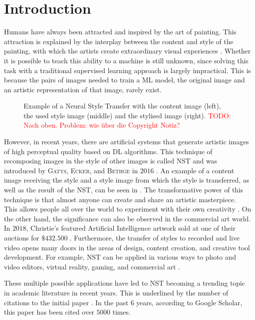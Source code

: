 \section{Introduction}
Humans have always been attracted and inspired by the art of painting. This attraction is explained by the interplay between the content and style of the painting, with which the artists create extraordinary visual experiences \cite{Glas2021}. Whether it is possible to teach this ability to a machine is still unknown, since solving this task with a traditional supervised learning approach is largely impractical. This is because the pairs of images needed to train a \gls{ML} model, the original image and an artistic representation of that image, rarely exist.
\begin{figure*}[!b]
	\centering
	
	\caption{Example of a Neural Style Transfer with the content image \contentimage{} (left), the used style image \styleimage{} (middle) and the stylised image \image{} (right). \textcolor{red}{TODO: Nach oben. Problem: wie über die Copyright Notiz?}}
	\label{fig:fig_nst}
\end{figure*}
 
However, in recent years, there are artificial systems that generate artistic images of high perceptual quality based on \gls{DL} algorithms. This technique of recomposing images in the style of other images is called \gls{NST} and was introduced by \textsc{Gatys}, \textsc{Ecker}, and \textsc{Bethge} in $2016$ \cite{GEB2016}. An example of a content image receiving the style and a style image from which the style is transferred, as well as the result of the \gls{NST}, can be seen in . The transformative power of this technique is that almost anyone can create and share an artistic masterpiece. This allows people all over the world to experiment with their own creativity \cite{Kel2018}. On the other hand, the significance can also be observed in the commercial art world. In $2018$, Christie's featured Artificial Intelligence artwork sold at one of their auctions for $\$432.500$ \cite{2018}. Furthermore, the transfer of styles to recorded and live video opens many doors in the areas of design, content creation, and creative tool development. For example, \gls{NST} can be applied in various ways to photo and video editors, virtual reality, gaming, and commercial art \cite{Glas2021, Ioa2021}.

These multiple possible applications have led to \gls{NST} becoming a trending topic in academic literature in recent years. This is underlined by the number of citations to the initial paper  \cite{GEB2016}. In the past $6$ years, according to Google Scholar, this paper has been cited over $5000$ times. 

